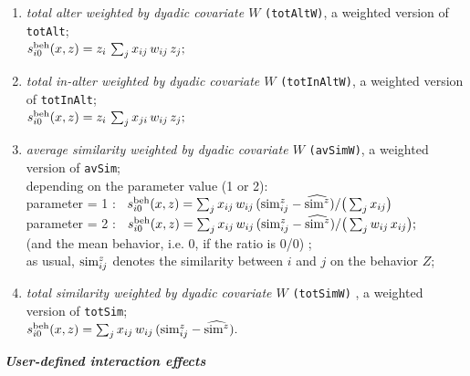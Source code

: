\documentclass[a4paper,fleqn,11pt]{article}
\newcommand{\+}{\, + \,}
\newcommand{\vit}{\theenumi}
\newcounter{savenumi}
\begin{document}
\begin{enumerate}
 \item {\em total alter weighted by dyadic covariate $W$}
                       \texttt{(totAltW)},
                       a weighted version of  \texttt{totAlt};\\
   $s^{\rm beh}_{i\vit}(x, z) =  z_i \, \sum_j x_{ij} \, w_{ij} \, z_j  ;$

 \item {\em total in-alter weighted by dyadic covariate $W$}
                       \texttt{(totInAltW)},
                       a weighted version of  \texttt{totInAlt};\\
   $s^{\rm beh}_{i\vit}(x, z) =  z_i \, \sum_j x_{ji} \, w_{ij} \, z_j  ;$

 \item {\em average similarity weighted by dyadic covariate $W$}
                       \texttt{(avSimW)},
                       a weighted version of  \texttt{avSim};\\
                       depending on the parameter value (1 or 2):\\
  parameter = 1 : \ $s^{\rm beh}_{i\vit}(x, z) =
                      \sum_j x_{ij} \, w_{ij} \,({\rm sim}^z_{ij} - \widehat{{\rm sim}^z})  /
                                        \big (\sum_j x_{ij}\big)$\\
   parameter = 2 : \  $s^{\rm beh}_{i\vit}(x, z) =
                  \sum_j x_{ij} \, w_{ij} \,({\rm sim}^z_{ij} - \widehat{{\rm sim}^z}) /
                                \big (\sum_j w_{ij} \,x_{ij}\big) ;$\\
 (and the mean behavior, i.e. $0$, if the ratio is 0/0) ;\\
   as usual, ${\rm sim}^z_{ij}$ denotes the similarity between $i$ and $j$
   on the behavior $Z$;
 \item {\em total similarity weighted by dyadic covariate $W$}
                       \texttt{(totSimW)} ,
                       a weighted version of  \texttt{totSim}; \\
   $s^{\rm beh}_{i\vit}(x, z) = \sum_j x_{ij} \, w_{ij} \, ({\rm sim}^z_{ij} - \widehat{{\rm sim}^z})  .$
\setcounter{savenumi}{\value{enumi}}
\end{enumerate}



\medskip

\noindent
\textbf{\emph{User-defined interaction effects}}
\medskip

\noindent
\end{document}
